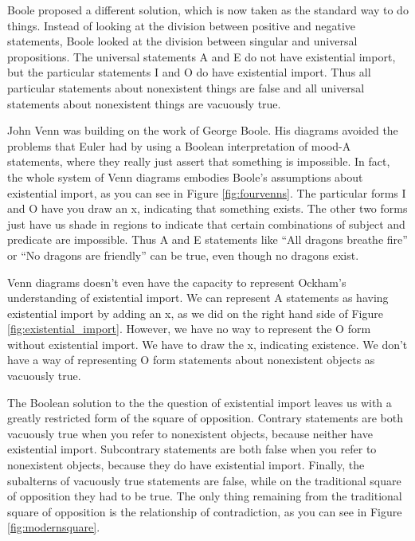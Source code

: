 Boole proposed a different solution, which is now taken as the standard way to do things. Instead of looking at the division between positive and negative statements, Boole looked at the division between singular and universal propositions. The universal statements A and E do not have existential import, but the particular statements I and O do have existential import. Thus all particular statements about nonexistent things are false and all universal statements about nonexistent things are vacuously true.

John Venn was building on the work of George Boole. His diagrams avoided the problems that Euler had by using a Boolean interpretation of mood-A statements, where they really just assert that something is impossible. In fact, the whole system of Venn diagrams embodies Boole's assumptions about existential import, as you can see in Figure \ref{fig:fourvenns}. The particular forms I and O have you draw an x, indicating that something exists. The other two forms just have us shade in regions to indicate that certain combinations of subject and predicate are impossible. Thus A and E statements like ``All dragons breathe fire'' or ``No dragons are friendly'' can be true, even though no dragons exist.

Venn diagrams doesn't even have the capacity to represent Ockham's understanding of existential import. We can represent A statements as having existential import by adding an x, as we did on the right hand side of Figure \ref{fig:existential_import}. However, we have no way to represent the O form without existential import. We have to draw the x, indicating existence. We don't have a way of representing O form statements about nonexistent objects as vacuously true.

The Boolean solution to the the question of existential import leaves us with a greatly restricted form of the square of opposition. Contrary statements are both vacuously true when you refer to nonexistent objects, because neither have existential import. Subcontrary statements are both false when you refer to nonexistent objects, because they do have existential import. Finally, the subalterns of vacuously true statements are false, while on the traditional square of opposition they had to be true. The only thing remaining from the traditional square of opposition is the relationship of contradiction, as you can see in Figure \ref{fig:modernsquare}.

